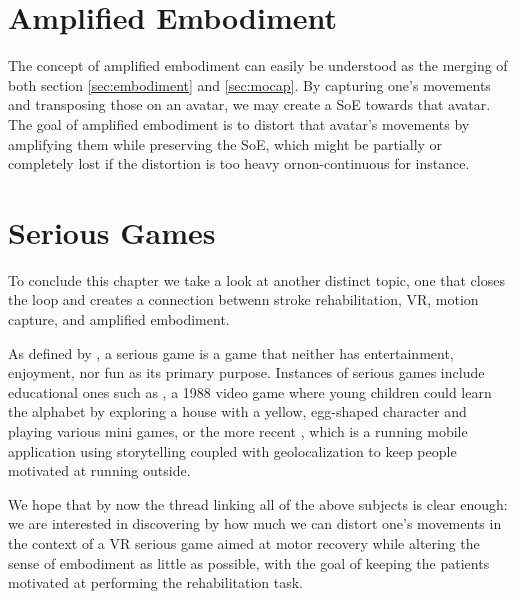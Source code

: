 \section{Amplified Embodiment}

The concept of amplified embodiment can easily be understood as the merging of both section \ref{sec:embodiment} and \ref{sec:mocap}. By capturing one's movements and transposing those on an avatar, we may create a SoE towards that avatar. The goal of amplified embodiment is to distort that avatar's movements by amplifying them while preserving the SoE, which might be partially or completely lost if the distortion is too heavy ornon-continuous for instance.

\section{Serious Games}

To conclude this chapter we take a look at another distinct topic, one that closes the loop and creates a connection betwenn stroke rehabilitation, VR, motion capture, and amplified embodiment.

As defined by \cite{djaouti2011classifying,chen2005proof}, a serious game is a game that neither has entertainment, enjoyment, nor fun as its primary purpose. Instances of serious games include educational ones such as \cite{epsitec1988blupi}, a 1988 video game where young children could learn the alphabet by exploring a house with a yellow, egg-shaped character and playing various mini games, or the more recent \cite{six2017zombie}, which is a running mobile application using storytelling coupled with geolocalization to keep people motivated at running outside.

We hope that by now the thread linking all of the above subjects is clear enough: we are interested in discovering by how much we can distort one's movements in the context of a VR serious game aimed at motor recovery while altering the sense of embodiment as little as possible, with the goal of keeping the patients motivated at performing the rehabilitation task.
